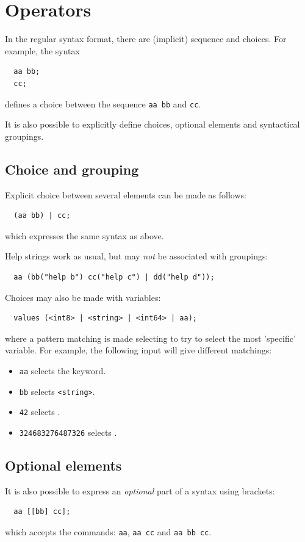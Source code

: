 \documentclass[a4paper, 10pt] {article}
\begin{document}
\section{Operators}
\label{sec:operators}

In the regular syntax format, there are (implicit) sequence and choices. For example, the syntax
\begin{verbatim}
  aa bb;
  cc;
\end{verbatim}
defines a choice between the sequence {\tt aa bb} and {\tt cc}.

It is also possible to explicitly define choices, optional elements and syntactical groupings.

\subsection{Choice and grouping}
Explicit choice between several elements can be made as follows:
\begin{verbatim}
  (aa bb) | cc;
\end{verbatim}
which expresses the same syntax as above.

Help strings work as usual, but may \emph{not} be associated with
groupings:
\begin{verbatim}
  aa (bb("help b") cc("help c") | dd("help d"));
\end{verbatim}

Choices may also be made with variables:
\begin{verbatim}
  values (<int8> | <string> | <int64> | aa);
\end{verbatim}

where a pattern matching is made selecting to try to select the most 'specific'
variable. For example, the following input will give different matchings:
\begin{itemize}
\item
{\tt aa} selects the keyword.
\item
{\tt bb} selects {\tt <string>}.
\item
{\tt 42} selects {\tt <int8>}.
\item
{\tt 324683276487326} selects {\tt <int64>}.
\end{itemize} 

\subsection{Optional elements}
It is also possible to express an \emph{optional} part of a syntax
using brackets:
\begin{verbatim}
  aa [[bb] cc];
\end{verbatim}
which accepts the commands: {\tt aa}, {\tt aa cc} and  {\tt aa bb cc}.
\end{document}
